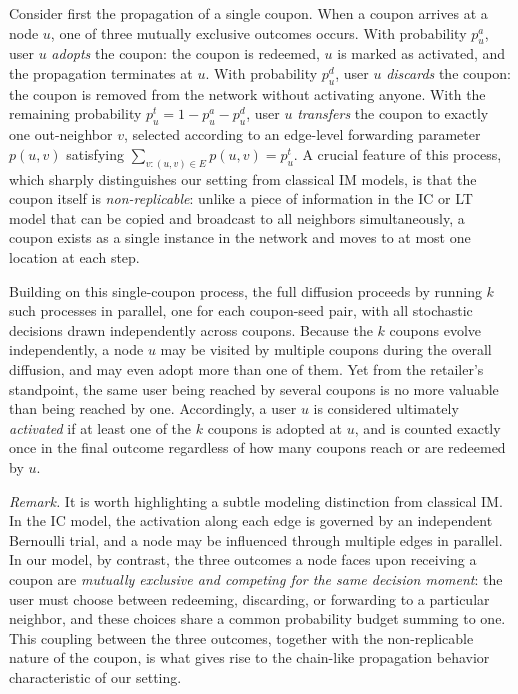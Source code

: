 \documentclass[sigconf]{acmart}
\begin{document}
Consider first the propagation of a single coupon. When a coupon arrives at a node $u$, one of three mutually exclusive outcomes occurs. With probability $p_u^a$, user $u$ \emph{adopts} the coupon: the coupon is redeemed, $u$ is marked as activated, and the propagation terminates at $u$. With probability $p_u^d$, user $u$ \emph{discards} the coupon: the coupon is removed from the network without activating anyone. With the remaining probability $p_u^t = 1 - p_u^a - p_u^d$, user $u$ \emph{transfers} the coupon to exactly one out-neighbor $v$, selected according to an edge-level forwarding parameter $p(u, v)$ satisfying $\sum_{v: (u, v) \in E} p(u, v) = p_u^t$. A crucial feature of this process, which sharply distinguishes our setting from classical IM models, is that the coupon itself is \emph{non-replicable}: unlike a piece of information in the IC or LT model that can be copied and broadcast to all neighbors simultaneously, a coupon exists as a single instance in the network and moves to at most one location at each step.

Building on this single-coupon process, the full diffusion proceeds by running $k$ such processes in parallel, one for each coupon-seed pair, with all stochastic decisions drawn independently across coupons. Because the $k$ coupons evolve independently, a node $u$ may be visited by multiple coupons during the overall diffusion, and may even adopt more than one of them. Yet from the retailer's standpoint, the same user being reached by several coupons is no more valuable than being reached by one. Accordingly, a user $u$ is considered ultimately \emph{activated} if at least one of the $k$ coupons is adopted at $u$, and is counted exactly once in the final outcome regardless of how many coupons reach or are redeemed by $u$.

\textit{Remark.} It is worth highlighting a subtle modeling distinction from classical IM. In the IC model, the activation along each edge is governed by an independent Bernoulli trial, and a node may be influenced through multiple edges in parallel. In our model, by contrast, the three outcomes a node faces upon receiving a coupon are \emph{mutually exclusive and competing for the same decision moment}: the user must choose between redeeming, discarding, or forwarding to a particular neighbor, and these choices share a common probability budget summing to one. This coupling between the three outcomes, together with the non-replicable nature of the coupon, is what gives rise to the chain-like propagation behavior characteristic of our setting.
\end{document}
